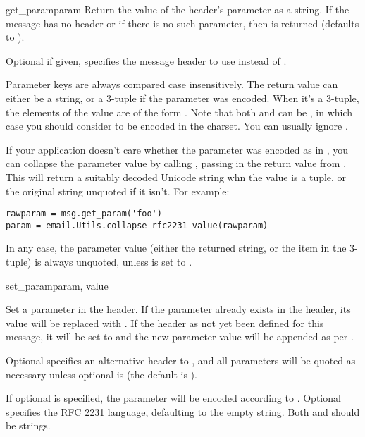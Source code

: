 \begin{methoddesc}[Message]{get_param}{param}
Return the value of the  header's parameter
 as a string.  If the message has no 
header or if there is no such parameter, then  is
returned (defaults to ).

Optional  if given, specifies the message header to use
instead of .

Parameter keys are always compared case insensitively.  The return
value can either be a string, or a 3-tuple if the parameter was
 encoded.  When it's a 3-tuple, the elements of the value are of
the form .  Note that both  and
 can be , in which case you should consider
 to be encoded in the  charset.  You can
usually ignore .

If your application doesn't care whether the parameter was encoded as in
, you can collapse the parameter value by calling
, passing in the return value
from .  This will return a suitably decoded Unicode string
whn the value is a tuple, or the original string unquoted if it isn't.  For
example:

\begin{verbatim}
rawparam = msg.get_param('foo')
param = email.Utils.collapse_rfc2231_value(rawparam)
\end{verbatim}

In any case, the parameter value (either the returned string, or the
 item in the 3-tuple) is always unquoted, unless
 is set to .

\end{methoddesc}

\begin{methoddesc}[Message]{set_param}{param, value}

Set a parameter in the  header.  If the
parameter already exists in the header, its value will be replaced
with .  If the  header as not yet
been defined for this message, it will be set to 
and the new parameter value will be appended as per .

Optional  specifies an alternative header to
, and all parameters will be quoted as
necessary unless optional  is  (the default
is ).

If optional  is specified, the parameter will be encoded
according to . Optional  specifies the RFC
2231 language, defaulting to the empty string.  Both  and
 should be strings.

\end{methoddesc}


